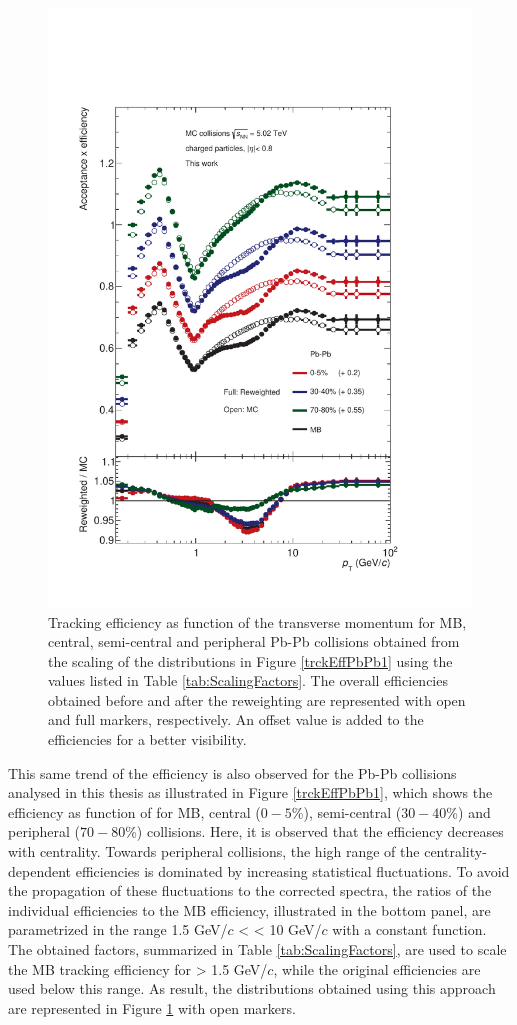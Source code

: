 \documentclass[12pt,a4paper]{report}
\begin{document}
\begin{figure}[tb!]
\centering
\includegraphics[width=12cm]{Plots/trckEffPbPb2.pdf}  
\caption{Tracking efficiency as function of the transverse momentum for MB, central, semi-central and peripheral Pb-Pb collisions obtained from the scaling of the distributions in Figure \ref{trckEffPbPb1} using the values listed in Table \ref{tab:ScalingFactors}. The overall efficiencies obtained before and after the reweighting are represented with open and full markers, respectively. An offset value is added to the efficiencies for a better visibility.}
\label{trckEffPbPb2}
\end{figure}
\hspace{-0.3cm} This same trend of the efficiency is also observed for the Pb-Pb collisions analysed in this thesis as illustrated in Figure \ref{trckEffPbPb1}, which shows the efficiency as function of \pt for MB, central ($0-5$\%), semi-central ($30-40$\%) and peripheral ($70-80$\%) collisions. Here, it is observed that the efficiency decreases with centrality. Towards peripheral collisions, the high \pt range of the centrality-dependent efficiencies is dominated by increasing statistical fluctuations. To avoid the propagation of these fluctuations to the corrected \pt spectra, the ratios of the individual efficiencies to the MB efficiency, illustrated in the bottom panel, are parametrized in the range 1.5 GeV/$c$ < \pt < 10 GeV/$c$ with a constant function. The obtained factors, summarized in Table \ref{tab:ScalingFactors}, are used to scale the MB tracking efficiency for \pt > 1.5 GeV/$c$, while the original efficiencies are used below this range. As result, the distributions obtained using this approach are represented in Figure \ref{trckEffPbPb2} with open markers. 
\end{document}
